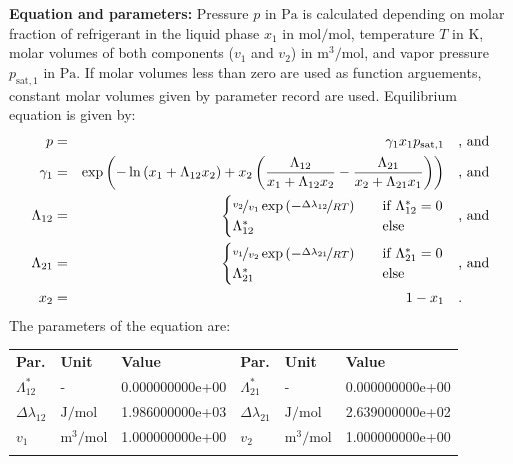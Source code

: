 \textbf{Equation and parameters:}
\newline
%
Pressure $p$ in $\si{\pascal}$ is calculated depending on molar fraction of refrigerant in the liquid phase $x_1$ in $\si{\mole\per\mole}$, temperature $T$ in $\si{\kelvin}$, molar volumes of both components ($v_1$ and $v_2$) in $\si{\cubic\meter\per\mole}$, and vapor pressure $p_\mathrm{sat,1}$ in $\si{\pascal}$. If molar volumes less than zero are used as function arguements, constant molar volumes given by parameter record are used. Equilibrium equation is given by:
%
\begin{equation*}
\begin{split}
p &=& \gamma_1 x_1 p_\mathrm{sat,1} & \quad\text{, and} \\
\gamma_1 &=& \exp \left( - \ln \left( x_1 + \Lambda_{12} x_2 \right) + x_2 \left( \frac{\Lambda_{12}}{x_1 + \Lambda_{12} x_2} - \frac{\Lambda_{21}}{x_2 + \Lambda_{21} x_1} \right) \right) & \quad\text{, and} \\
\Lambda_{12} &=& \begin{cases} \nicefrac{v_2}{v_1} \exp \left( - \nicefrac{\Delta\lambda_{12}}{R T} \right) & \quad \text{if } \Lambda_{12}^{*} = 0 \\ \Lambda_{12}^{*}  & \quad \text{else} \end{cases}  & \quad\text{, and} \\
\Lambda_{21} &=& \begin{cases} \nicefrac{v_1}{v_2} \exp \left( - \nicefrac{\Delta\lambda_{21}}{R T} \right) & \quad \text{if } \Lambda_{21}^{*} = 0 \\ \Lambda_{21}^{*}  & \quad \text{else} \end{cases}  & \quad\text{, and} \\
x_2 &=& 1 - x_1  & \quad\text{.} \\
\end{split}
\end{equation*}
%
The parameters of the equation are:
%
\begin{longtable}[l]{lll|lll}
\toprule
\addlinespace
\textbf{Par.} & \textbf{Unit} & \textbf{Value} &	\textbf{Par.} & \textbf{Unit} & \textbf{Value} \\
\addlinespace
\midrule
\endhead

\bottomrule
\endfoot
\bottomrule
\endlastfoot
\addlinespace

$\Lambda_{12}^{*}$ & - & 0.000000000e+00 & $\Lambda_{21}^{*}$ & - & 0.000000000e+00 \\
$\Delta\lambda_{12}$ & $\si{\joule\per\mole}$ & 1.986000000e+03 & $\Delta\lambda_{21}$ & $\si{\joule\per\mole}$ & 2.639000000e+02 \\
$v_1$ & $\si{\cubic\meter\per\mole}$ & 1.000000000e+00 & $v_2$ & $\si{\cubic\meter\per\mole}$ & 1.000000000e+00 \\

\addlinespace\end{longtable}

